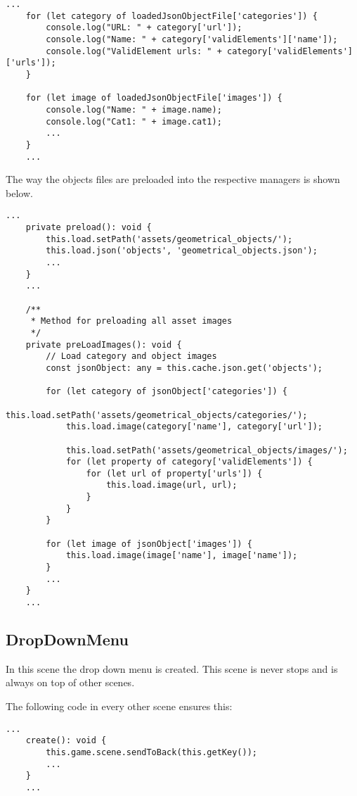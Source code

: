 \begin{lstlisting}[style=TypeScript, caption=Example json file access]
    ...
    for (let category of loadedJsonObjectFile['categories']) {
        console.log("URL: " + category['url']);
        console.log("Name: " + category['validElements']['name']);
        console.log("ValidElement urls: " + category['validElements']['urls']);
    }

    for (let image of loadedJsonObjectFile['images']) {
        console.log("Name: " + image.name);
        console.log("Cat1: " + image.cat1);
        ...
    }
    ...
\end{lstlisting}

The way the objects files are preloaded into the respective managers is shown below.

\begin{lstlisting}[style=TypeScript, caption=preloadAsset.ts]
    ...
    private preload(): void {
        this.load.setPath('assets/geometrical_objects/');
        this.load.json('objects', 'geometrical_objects.json');
        ...
    }
    ...

    /**
     * Method for preloading all asset images
     */
    private preLoadImages(): void {
        // Load category and object images
        const jsonObject: any = this.cache.json.get('objects');

        for (let category of jsonObject['categories']) {
            this.load.setPath('assets/geometrical_objects/categories/');
            this.load.image(category['name'], category['url']);

            this.load.setPath('assets/geometrical_objects/images/');
            for (let property of category['validElements']) {
                for (let url of property['urls']) {
                    this.load.image(url, url);
                }
            }
        }

        for (let image of jsonObject['images']) {
            this.load.image(image['name'], image['name']);
        }
        ...
    }
    ...
\end{lstlisting}

\subsection{DropDownMenu}\label{subsec:dropdownmenu}
In this scene the drop down menu is created.
This scene is never stops and is always on top of other scenes.

The following code in every other scene ensures this:
\begin{lstlisting}[style=TypeScript, caption=Send current scene to back]
    ...
    create(): void {
        this.game.scene.sendToBack(this.getKey());
        ...
    }
    ...
\end{lstlisting}

